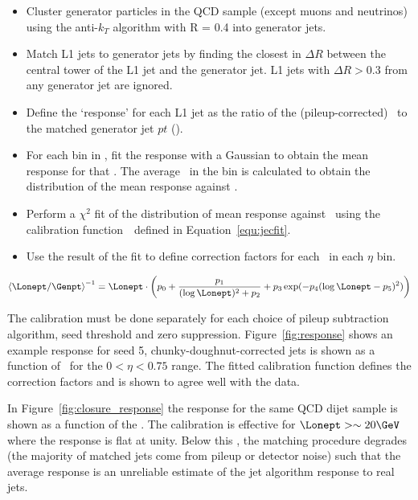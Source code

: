 \begin{itemize}
\item Cluster generator particles in the QCD sample (except muons and neutrinos) using the anti-$k_T$ algorithm with R = 0.4 into generator jets.
\item Match L1 jets to generator jets by finding the closest in $\Delta R$ between the central tower of the L1 jet and the generator jet. L1 jets with 
$\Delta R > 0.3$ from any generator jet are ignored.
\item Define the `response' for each L1 jet as the ratio of the (pileup-corrected) \Lonept~to the matched generator jet $pt$ (\Genpt).
\item For each bin in \Genpt, fit the response with a Gaussian to obtain the mean response for that \Genpt. 
The average \Lonept~in the bin is calculated to obtain the distribution of the mean response against \Lonept.
\item Perform a $\chi^2$ fit of the distribution of mean response against \Lonept~using the calibration
 function~\cite{l1jet_calibration}~defined in Equation~\ref{equ:jecfit}.
\item Use the result of the fit to define correction factors for each \Lonept~in each $\eta$ bin.
\end{itemize}

\begin{equation}
\left<\Lonept/\Genpt\right>^{-1} = \Lonept \cdot \left ( p_{0} + 
\frac{p_{1}}{(\log \Lonept)^{2}+p_{2}}+p_{3} \exp(-p_{4}
(\log \Lonept-p_{5} ) ^{2}) \right )
\label{equ:jecfit}
\end{equation}

The calibration must be done separately for each choice of pileup subtraction algorithm, seed threshold and zero suppression. 
Figure~\ref{fig:response} shows an example response for seed 5, chunky-doughnut-corrected jets is shown as a function of \Lonept~for 
the $0 < \eta < 0.75$ range. The fitted calibration function defines the correction 
factors and is shown to agree well with the data.

In Figure~\ref{fig:closure_response} the response for the same QCD dijet sample is shown as a function of the \Lonept. The calibration
is effective for $\Lonept > \sim 20 \GeV$ where the response is flat at unity. Below this \pt,
the matching procedure degrades (the majority of matched jets come from pileup or detector noise) 
such that the average response is an unreliable estimate of the jet algorithm response to real jets.

